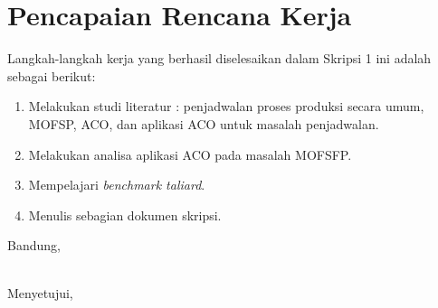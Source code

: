 \documentclass[a4paper,twoside]{article}
\begin{document}
\section{Pencapaian Rencana Kerja}
Langkah-langkah kerja yang berhasil diselesaikan dalam Skripsi 1 ini adalah sebagai berikut:
\begin{enumerate}
\item Melakukan studi literatur : penjadwalan proses produksi secara umum, MOFSP, ACO, dan aplikasi ACO untuk masalah penjadwalan.
\item Melakukan analisa aplikasi ACO pada masalah MOFSFP.
\item Mempelajari {\it benchmark taliard}.
\item Menulis sebagian dokumen skripsi.


\end{enumerate}





\vspace{1cm}
\centering Bandung, \tanggal\\
\vspace{2cm} \nama \\ 
\vspace{1cm}

Menyetujui, \\
\end{document}
